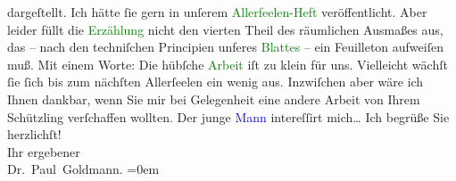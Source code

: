                dargeſtellt. Ich hätte ſie gern in unſerem \textcolor{green}{Allerfeelen-Heft}{} veröffentlicht. Aber leider füllt die \textcolor{green}{Erzählung}{} nicht den vierten
               Theil des räumlichen Ausmaßes aus, das – nach den techniſchen Principien unferes {\pb}\textcolor{green}{Blattes}{} – ein Feuilleton
               aufweiſen muß. Mit einem Worte: Die hübſche \textcolor{green}{Arbeit}{} iſt zu klein für uns. Vielleicht wächſt ſie ſich bis
               zum nächſten Allerſeelen ein wenig aus. Inzwiſchen
               aber wäre ich Ihnen dankbar, wenn Sie mir bei Gelegenheit eine andere Arbeit von
               Ihrem Schützling verſchaffen wollten. Der junge \textcolor{blue}{Mann}{} intereſſirt mich{\dots}\pend
           \pstart
           Ich begrüße Sie herzlichſt! {\\[\baselineskip]}Ihr ergebener {\\[\baselineskip]}\spacefill\mbox{Dr. Paul Goldmann.}\pend
           \leftskip=0em{}\endnumbering{}  
      